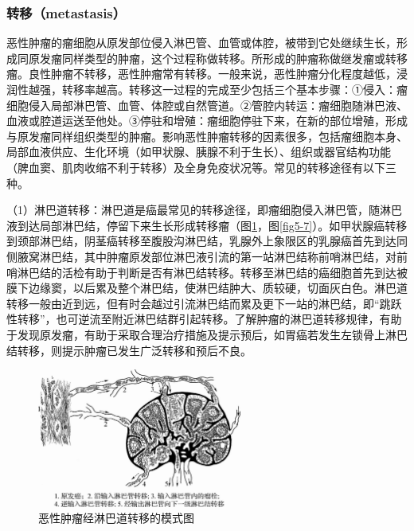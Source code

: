 \subsubsection{转移（metastasis）}

恶性肿瘤的瘤细胞从原发部位侵入淋巴管、血管或体腔，被带到它处继续生长，形成同原发瘤同样类型的肿瘤，这个过程称做转移。所形成的肿瘤称做继发瘤或转移瘤。良性肿瘤不转移，恶性肿瘤常有转移。一般来说，恶性肿瘤分化程度越低，浸润性越强，转移率越高。转移这一过程的完成至少包括三个基本步骤：①侵入：瘤细胞侵入局部淋巴管、血管、体腔或自然管道。②管腔内转运：瘤细胞随淋巴液、血液或腔道运送至他处。③停驻和增殖：瘤细胞停驻下来，在新的部位增殖，形成与原发瘤同样组织类型的肿瘤。影响恶性肿瘤转移的因素很多，包括瘤细胞本身、局部血液供应、生化环境（如甲状腺、胰腺不利于生长）、组织或器官结构功能（脾血窦、肌肉收缩不利于转移）及全身免疫状况等。常见的转移途径有以下三种。

（1）淋巴道转移：淋巴道是癌最常见的转移途径，即瘤细胞侵入淋巴管，随淋巴液到达局部淋巴结，停留下来生长形成转移瘤（图\ref{fig5-6}，图\ref{fig5-7}）。如甲状腺癌转移到颈部淋巴结，阴茎癌转移至腹股沟淋巴结，乳腺外上象限区的乳腺癌首先到达同侧腋窝淋巴结，其中肿瘤原发部位淋巴液引流的第一站淋巴结称前哨淋巴结，对前哨淋巴结的活检有助于判断是否有淋巴结转移。转移至淋巴结的癌细胞首先到达被膜下边缘窦，以后累及整个淋巴结，使淋巴结肿大、质较硬，切面灰白色。淋巴道转移一般由近到远，但有时会越过引流淋巴结而累及更下一站的淋巴结，即“跳跃性转移”，也可逆流至附近淋巴结群引起转移。了解肿瘤的淋巴道转移规律，有助于发现原发瘤，有助于采取合理治疗措施及提示预后，如胃癌若发生左锁骨上淋巴结转移，则提示肿瘤已发生广泛转移和预后不良。

\begin{figure}[!htbp]
  \centering
  \includegraphics[width=0.6\textwidth]{./images/Image00073.jpg}
  \caption{恶性肿瘤经淋巴道转移的模式图}
  \label{fig5-6}
\end{figure}

